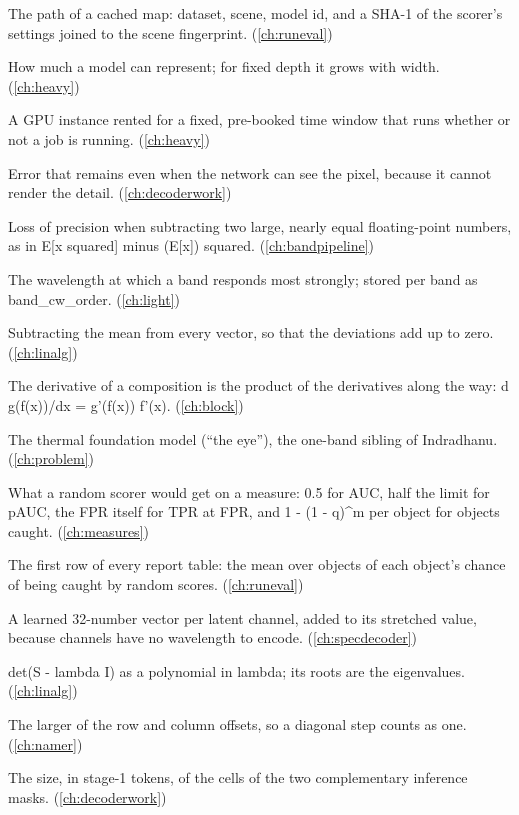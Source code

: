 \begin{description}[style=nextline,leftmargin=1.2em,font=\normalfont\bfseries]
\item[Cache key] The path of a cached map: dataset, scene, model id, and a SHA-1 of the scorer's settings joined to the scene fingerprint. (\cref{ch:runeval})
\item[Capacity] How much a model can represent; for fixed depth it grows with width. (\cref{ch:heavy})
\item[Capacity block] A GPU instance rented for a fixed, pre-booked time window that runs whether or not a job is running. (\cref{ch:heavy})
\item[Capacity limit] Error that remains even when the network can see the pixel, because it cannot render the detail. (\cref{ch:decoderwork})
\item[Catastrophic cancellation] Loss of precision when subtracting two large, nearly equal floating-point numbers, as in E[x squared] minus (E[x]) squared. (\cref{ch:bandpipeline})
\item[Centre wavelength] The wavelength at which a band responds most strongly; stored per band as band\_cw\_order. (\cref{ch:light})
\item[Centring] Subtracting the mean from every vector, so that the deviations add up to zero. (\cref{ch:linalg})
\item[Chain rule] The derivative of a composition is the product of the derivatives along the way: d g(f(x))/dx = g'(f(x)) f'(x). (\cref{ch:block})
\item[Chakshu] The thermal foundation model (``the eye''), the one-band sibling of Indradhanu. (\cref{ch:problem})
\item[Chance level] What a random scorer would get on a measure: 0.5 for AUC, half the limit for pAUC, the FPR itself for TPR at FPR, and 1 - (1 - q)\^{}m per object for objects caught. (\cref{ch:measures})
\item[Chance row] The first row of every report table: the mean over objects of each object's chance of being caught by random scores. (\cref{ch:runeval})
\item[Channel identity] A learned 32-number vector per latent channel, added to its stretched value, because channels have no wavelength to encode. (\cref{ch:specdecoder})
\item[Characteristic polynomial] det(S - lambda I) as a polynomial in lambda; its roots are the eigenvalues. (\cref{ch:linalg})
\item[Chebyshev distance] The larger of the row and column offsets, so a diagonal step counts as one. (\cref{ch:namer})
\item[Checkerboard cell size] The size, in stage-1 tokens, of the cells of the two complementary inference masks. (\cref{ch:decoderwork})

\end{description}
